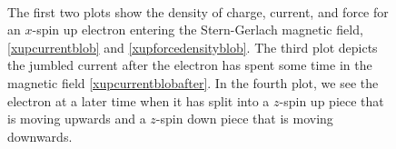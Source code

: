 \documentclass[onecolumn,secnumarabic,amsmath,amssymb,balancelastpage,nofootinbib]{article}
\begin{document}
\begin{figure}[p!]
\\
\vspace*{-4pt}
\caption{The first two plots show the density of charge, current, and force for an $x$-spin up electron entering the Stern-Gerlach magnetic field, \eqref{xupcurrentblob} and \eqref{xupforcedensityblob}.  The third plot depicts the jumbled current after the electron has spent some time in the magnetic field \eqref{xupcurrentblobafter}.  In the fourth plot, we see the electron at a later time when it has split into a $z$-spin up piece that is moving upwards and a $z$-spin down piece that is moving downwards.}
  \label{SG4}
\end{figure}
\end{document}
